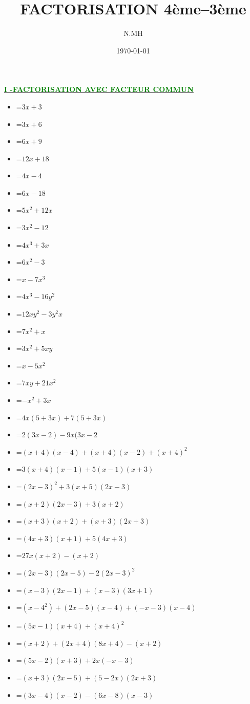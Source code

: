 \documentclass[a4paper,12pt]{article}
\title{FACTORISATION 4ème--3ème}
\date{\today}
\author{N.MH}
\begin{document}
	\maketitle
	\vrule
	\begin{center}
		\textbf{\underline{\textcolor{green}{ I -FACTORISATION AVEC FACTEUR COMMUN }}} \\ 
		\begin{itemize}
			\item [$A_1(x)$]=$3x+3$
			\item [$A_2(x)$]=$3x+6$
			\item [$A_3(x)$]=$6x+9$
			\item [$A_4(x)$]=$12x+18$ 
			\item [$A_5(x)$]=$4x-4$
			\item [$A_6(x)$]=$6x-18$
			\item [$A_7(x)$]=$5x^2+12x$
			\item [$A_8(x)$]=$3x^2-12$
			\item [$A_9(x)$]=$4x^3+3x$
			\item [$A_10(x)$]=$6x^2-3$
			\item [$A_11(x)$]=$x-7x^3$
			\item [$A_12(x)$]=$4x^3-16y^2$
			\item [$A_13(x)$]=$12xy^2-3y^2x$
			\item [$A_14(x)$]=$7x^2+x$
			\item [$A_15(x)$]=$3x^2+5xy$
			\item [$A_16(x)$]=$x-5x^2$
			\item [$A_17(x)$]=$7xy+21x^2$
			\item [$A_18(x)$]=$-x^2+3x$
			\item[$B_1(x)$]=$4x(5+3x)+7(5+3x) $
			\item[$B_2(x)$]=$2(3x-2)-9x(3x-2$
			\item[$B_3(x)$]=$(x+4)(x-4)+(x+4)(x-2)+(x+4)^2$
			\item[$B_4(x)$]=$3(x+4)(x-1)+5(x-1)(x+3)$
			\item[$B_5(x)$]=$(2x-3)^2+3(x+5)(2x-3)$
			\item[$B_6(x)$]=$(x+2)(2x-3)+3(x+2)$
			\item[$B_7(x)$]=$(x+3)(x+2)+(x+3)(2x+3)$
			\item[$B_8(x)$]=$(4x+3)(x+1)+5(4x+3)$
			\item[$B_9(x)$]=$27x(x+2)-(x+2)$
			\item[$B_{10}(x)$]=$(2x-3)(2x-5)-2(2x-3)^2$
			\item[$B_{11}(x)$]=$(x-3)(2x-1)+(x-3)(3x+1)$
			\item[$B_{12}(x)$]=$(x-4^2)+(2x-5)(x-4)+(-x-3)(x-4)$
			\item[$B_{13}(x)$]=$(5x-1)(x+4)+(x+4)^2$
			\item[$B_{14}(x)$]=$(x+2)+(2x+4)(8x+4)-(x+2)$
			\item[$B_{15}(x)$]=$(5x-2)(x+3)+2x(-x-3)$
			\item[$B_{16}(x)$]=$(x+3)(2x-5)+(5-2x)(2x+3)$
			\item[$B_{17}(x)$]=$(3x-4)(x-2)-(6x-8)(x-3)$ 
			

\end{itemize}
\end{center}
\end{document}
